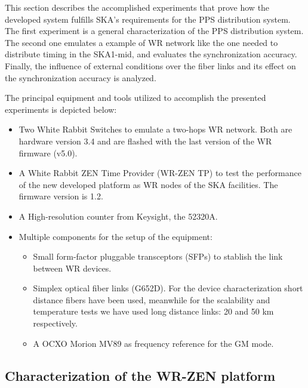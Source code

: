 
This section describes the accomplished experiments that prove how the 
developed system fulfills SKA's requirements for the PPS distribution system. 
 The first experiment is a general 
characterization of the PPS distribution system. The second one emulates a 
example of WR network like the one needed to distribute timing in the SKA1-mid, 
and evaluates the synchronization accuracy. Finally, the influence of external 
conditions over the fiber links and its effect on the synchronization accuracy 
is analyzed.

The principal equipment and tools utilized to accomplish the presented 
experiments is depicted below:

\begin{itemize}
    \item Two White Rabbit Switches to emulate a two-hops WR network. Both are 
    hardware version 3.4 and are flashed with the last version of the WR 
    firmware (v5.0).
    
    \item A White Rabbit ZEN Time Provider (WR-ZEN TP) to test the performance 
    of the new developed platform as WR nodes of the SKA facilities. The 
    firmware version is 1.2.
    
    \item A High-resolution counter from Keysight, the 52320A.
    
    \item Multiple components for the setup of the equipment:
    \begin{itemize}
        \item Small form-factor pluggable transceptors (SFPs) to stablish the 
        link between WR devices.
        \item Simplex optical fiber links (G652D). For the device 
        characterization short distance fibers have been used, meanwhile for 
        the scalability and temperature tests we have used long distance links: 
        20 and 50 km respectively.
        \item A OCXO Morion MV89 as frequency reference for the GM mode.
    \end{itemize}
    
\end{itemize}

\subsection{Characterization of the WR-ZEN platform}
\label{subsec: charact_zen}

